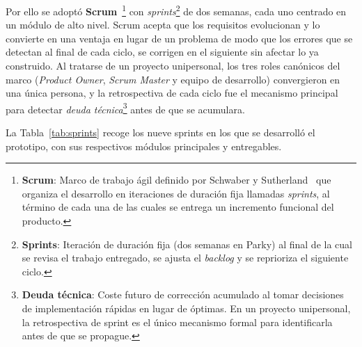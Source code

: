 Por ello se adoptó \textbf{Scrum}~\cite{scrum2020}\footnote{\textbf{Scrum}: Marco de trabajo ágil definido por Schwaber y Sutherland~\cite{scrum2020} que organiza el desarrollo en iteraciones de duración fija llamadas \textit{sprints}, al término de cada una de las cuales se entrega un incremento funcional del producto.} con \textit{sprints}\footnote{\textbf{Sprints}: Iteración de duración fija (dos semanas en Parky) al final de la cual se revisa el trabajo entregado, se ajusta el \textit{backlog} y se reprioriza el siguiente ciclo.} de dos semanas, cada uno centrado en un módulo de alto nivel. Scrum acepta que los requisitos evolucionan y lo convierte en una ventaja en lugar de un problema de modo que los errores que se detectan al final de cada ciclo, se corrigen en el siguiente sin afectar lo ya construido. Al tratarse de un proyecto unipersonal, los tres roles canónicos del marco (\textit{Product Owner}, \textit{Scrum Master} y equipo de desarrollo) convergieron en una única persona, y la retrospectiva de cada ciclo fue el mecanismo principal para detectar \textit{deuda técnica}\footnote{\textbf{Deuda técnica}: Coste futuro de corrección acumulado al tomar decisiones de implementación rápidas en lugar de óptimas. En un proyecto unipersonal, la retrospectiva de sprint es el único mecanismo formal para identificarla antes de que se propague.} antes de que se acumulara.

La Tabla~\ref{tab:sprints} recoge los nueve sprints en los que se desarrolló el prototipo, con sus respectivos módulos principales y entregables.

